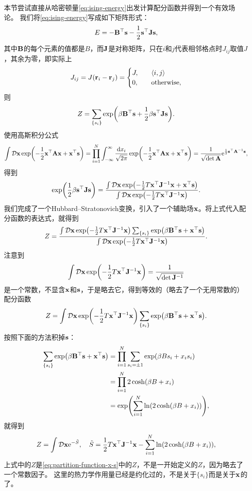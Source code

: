\documentclass[hyperref, UTF8, a4paper]{ctexart}
\newcommand*{\ee}{\mathrm{e}}
\newcommand*{\pair}[1]{\langle #1 \rangle}
\newcommand*{\fd}[1]{\mathop{}\!\mathcal{D} #1}
\begin{document}
本节尝试直接从哈密顿量\eqref{eq:ising-energy}出发计算配分函数并得到一个有效场论。
我们将\eqref{eq:ising-energy}写成如下矩阵形式：
\begin{equation}
    E = - \vb{B}^\top \vb{s} - \frac{1}{2} \vb{s}^\top \vb{J} \vb{s}, 
\end{equation}
其中$\vb{B}$的每个元素的值都是$B$，而$\vb{J}$是对称矩阵，只在$i$和$j$代表相邻格点时$J_{ij}$取值$J$，其余为零，即实际上
\begin{equation}
    J_{ij} = J(\vb{r}_i - \vb{r}_j) = \begin{cases}
        J, \quad &\pair{i, j} \\
        0, \quad &\text{otherwise},
    \end{cases}
\end{equation}
则
\[
    Z = \sum_{\{s_i\}} \exp(\beta \vb{B}^\top \vb{s} + \frac{1}{2} \beta \vb{s}^\top \vb{J} \vb{s}).
\]
使用高斯积分公式
\[
    \int \fd{\vb{x}} \exp(-\frac{1}{2} \vb{x}^\top \vb{A} \vb{x} + \vb{x}^\top \vb{s}) 
    = \prod_{i=1}^N \int_{-\infty}^\infty \frac{\dd{x_i}}{\sqrt{2\pi}} \exp(-\frac{1}{2} \vb{x}^\top \vb{A} \vb{x} + \vb{x}^\top \vb{s}) = \frac{1}{\sqrt{\det \vb{A}}} \ee^{\frac{1}{2} \vb{s}^\top \vb{A}^{-1} \vb{s}},
\]
得到
\[
    \exp(\frac{1}{2} \beta \vb{s}^\top \vb{J} \vb{s}) = \frac{\int \fd{\vb{x}} \exp(- \frac{1}{2} T \vb{x}^\top \vb{J}^{-1} \vb{x} + \vb{x}^\top \vb{s})}{\int \fd{\vb{x}} \exp(- \frac{1}{2} T \vb{x}^\top \vb{J}^{-1} \vb{x} )}.
\]
我们完成了一个Hubbard–Stratonovich变换，引入了一个辅助场$\vb{x}$。将上式代入配分函数的表达式，就得到
\[
    Z = \frac{\int \fd{\vb{x}} \exp(-\frac{1}{2} T \vb{x}^\top \vb{J}^{-1} \vb{x}) \sum_{\{s_i\}} \exp(\beta \vb{B}^\top \vb{s} + \vb{x}^\top \vb{s})}{\int \fd{\vb{x}} \exp(-\frac{1}{2} T \vb{x}^\top \vb{J}^{-1} \vb{x})}.
\]
注意到
\[
    \int \fd{\vb{x}} \exp(-\frac{1}{2} T \vb{x}^\top \vb{J}^{-1} \vb{x}) = \frac{1}{\sqrt{\det \vb{J}^{-1}}}
\]
是一个常数，不显含$\vb{x}$和$\vb{s}$，于是略去它，得到等效的（略去了一个无用常数的）配分函数
\begin{equation}
    Z = \int \fd{\vb{x}} \exp(-\frac{1}{2} T \vb{x}^\top \vb{J}^{-1} \vb{x}) \sum_{\{s_i\}} \exp(\beta \vb{B}^\top \vb{s} + \vb{x}^\top \vb{s}).
    \label{eq:partition-function-x-s}
\end{equation}
按照下面的方法积掉$\vb{s}$：
\[
    \begin{aligned}
        \sum_{\{s_i\}} \exp(\beta \vb{B}^\top \vb{s} + \vb{x}^\top \vb{s}) &= \prod_{i=1}^N \sum_{s_i = \pm 1} \exp(\beta B s_i + x_i s_i) \\
        &= \prod_{i=1}^N 2\cosh(\beta B + x_i) \\
        &= \exp(\sum_{i=1}^N \ln(2\cosh(\beta B + x_i))),
    \end{aligned}
\]
就得到
\begin{equation}
    Z = \int \fd{\vb{x}} \ee^{-\tilde{S}}, \quad \tilde{S} = \frac{1}{2} T \vb{x}^\top \vb{J}^{-1} \vb{x} - \sum_{i=1}^N \ln(2\cosh(\beta B + x_i)),
    \label{eq:action-of-x}
\end{equation}
上式中的$Z$是\eqref{eq:partition-function-x-s}中的$Z$，不是一开始定义的$Z$，因为略去了一个常数因子。
这里的热力学作用量已经是约化过的，不是关于$\{s_i\}$而是关于$\vb{x}$的了。
\end{document}
